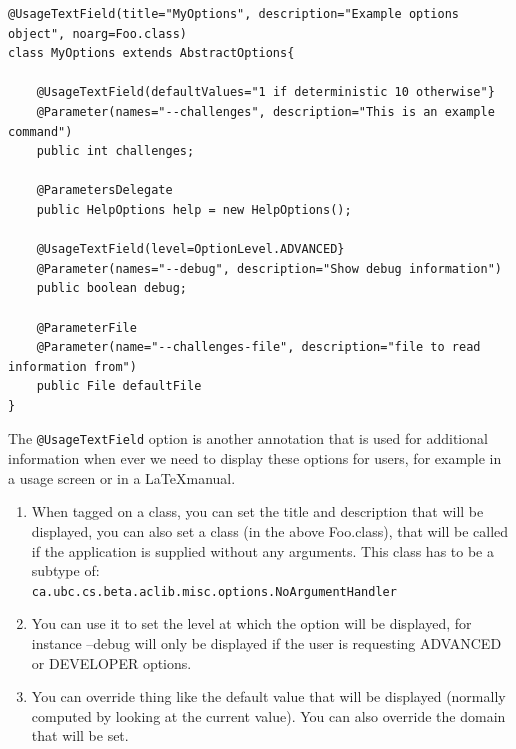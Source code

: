 \documentclass[11pt,letterpaper,oneside]{article}
\begin{document}
 

  
  
\begin{small}
\begin{lstlisting}[]
@UsageTextField(title="MyOptions", description="Example options object", noarg=Foo.class)
class MyOptions extends AbstractOptions{

	@UsageTextField(defaultValues="1 if deterministic 10 otherwise"}
	@Parameter(names="--challenges", description="This is an example command")
	public int challenges;
	
	@ParametersDelegate 
	public HelpOptions help = new HelpOptions();

	@UsageTextField(level=OptionLevel.ADVANCED}
	@Parameter(names="--debug", description="Show debug information")
	public boolean debug;

	@ParameterFile
	@Parameter(name="--challenges-file", description="file to read information from")
	public File defaultFile
}
\end{lstlisting}
\end{small}

The \texttt{@UsageTextField} option is another annotation that is used for additional information when ever we need to display these options for users, for example in a usage screen or in a \LaTeX manual. 

\begin{enumerate} 
\item When tagged on a class, you can set the title and description that will be displayed, you can also set a class (in the above Foo.class), that will be called if the application is supplied without any arguments. This class has to be a subtype of:\\ \texttt{ca.ubc.cs.beta.aclib.misc.options.NoArgumentHandler}

\item You can use it to set the level at which the option will be displayed, for instance --debug will only be displayed if the user is requesting ADVANCED or DEVELOPER options.

\item You can override thing like the default value that will be displayed (normally computed by looking at the current value). You can also override the domain that will be set.
\end{enumerate}
\end{document}
